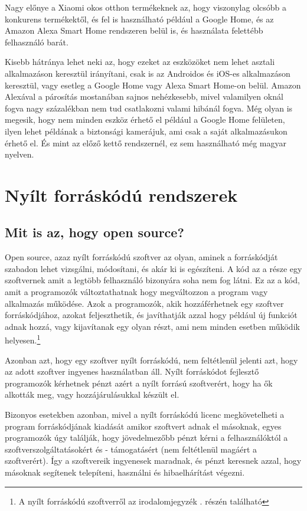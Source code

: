 \documentclass[
]{thesis-ekf}
\theoremstyle{definition}
\theoremstyle{remark}
\begin{document}
	Nagy előnye a Xiaomi okos otthon termékeknek az, hogy viszonylag olcsóbb a konkurens termékektől, és fel is használható például a Google Home, és az Amazon Alexa Smart Home rendszeren belül is, és használata felettébb felhasználó barát.
	
	Kisebb hátránya lehet neki az, hogy ezeket az eszközöket nem lehet asztali alkalmazáson keresztül irányítani, csak is az Androidos és iOS-es alkalmazáson keresztül, vagy esetleg a Google Home vagy Alexa Smart Home-on belül. Amazon Alexával a párosítás mostanában sajnos nehézkesebb, mivel valamilyen oknál fogva nagy százalékban nem tud csatlakozni valami hibánál fogva. Még olyan is megesik, hogy nem minden eszköz érhető el például a Google Home felületen, ilyen lehet példának a biztonsági kamerájuk, ami csak a saját alkalmazásukon érhető el. És mint az előző kettő rendszernél, ez sem használható még magyar nyelven.
	
	\section{Nyílt forráskódú rendszerek}
	\subsection{Mit is az, hogy open source?}
	Open source, azaz nyílt forráskódú szoftver az olyan, aminek a forráskódját szabadon lehet vizsgálni, módosítani, és akár ki is egészíteni. A kód az a része egy szoftvernek amit a legtöbb felhasználó bizonyára soha nem fog látni. Ez az a kód, amit a programozók változtathatnak hogy megváltozzon a program vagy alkalmazás működése. Azok a programozók, akik hozzáférhetnek egy szoftver forráskódjához, azokat feljeszthetik, és javíthatják azzal hogy például új funkciót adnak hozzá, vagy kijavítanak egy olyan részt, ami nem minden esetben működik helyesen.\footnote{\label{open-source-fn}A nyílt forráskódú szoftverről az irodalomjegyzék \cite{what-is-open-source}. részén található}
	
	Azonban azt, hogy egy szoftver nyílt forráskódú, nem feltétlenül jelenti azt, hogy az adott szoftver ingyenes használatban áll. Nyílt forráskódot fejlesztő programozók kérhetnek pénzt azért a nyílt forrású szoftverért, hogy ha ők alkották meg, vagy hozzájárulásukkal készült el. 
	
	Bizonyos esetekben azonban, mivel a nyílt forráskódú licenc megkövetelheti a program forráskódjának kiadását amikor szoftvert adnak el másoknak, egyes programozók úgy találják, hogy jövedelmezőbb pénzt kérni a felhasználóktól a szoftverszolgáltatásokért és - támogatásért (nem feltétlenül magáért a szoftverért). Így a szoftvereik ingyenesek maradnak, és pénzt keresnek azzal, hogy másoknak segítenek telepíteni, használni és hibaelhárítást végezni.
	
\end{document}
